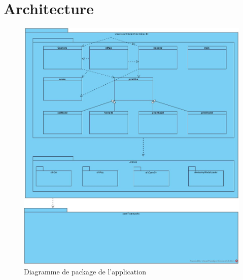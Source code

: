 \chapter{Architecture}
\label{s:architecture}

\begin{figure}
	\centering
	\includegraphics[width=15cm]{fig/Diagramme.jpg}
	\caption{Diagramme de package de l'application}
	\label{fig:diagrammeDePackage}
\end{figure}
